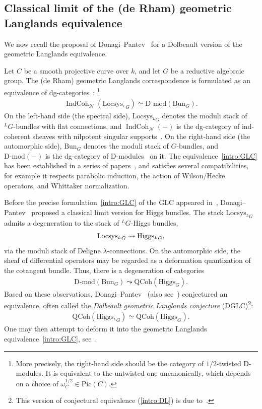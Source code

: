 \documentclass [11pt,oneside,a4paper,mathscr]{amsart}
\theoremstyle{definition}
\newcommand{\IndCoh}{\operatorname{IndCoh}}
\newcommand{\Hig}{\mathrm{Higgs}}
\newcommand{\Bun}{\mathrm{Bun}}
\begin{document}
\subsection{Classical limit of the (de Rham) geometric Langlands equivalence}

We now recall the proposal of Donagi--Pantev~\cite{DoPa} for a Dolbeault version of the geometric Langlands equivalence.

Let $C$ be a smooth projective curve over $k$, and let $G$ be a reductive algebraic group. The (de Rham) geometric Langlands correspondence is formulated as an equivalence of dg-categories~\cite{BD0, AG}: 
\footnote{
More precisely, the right-hand side should be the category of $1/2$-twisted D-modules.
It is equivalent to the untwisted one uncanonically, which depends on a choice of $\omega_C^{1/2}\in \mathrm{Pic}(C)$.}
\begin{align}\label{intro:GLC} \IndCoh_{\mathcal{N}}(\mathrm{Locsys}_{^{L}G}) \simeq \mathrm{D\text{-}mod}(\Bun_G). \end{align} 
On the left-hand side (the spectral side), $\mathrm{Locsys}_{^{L}G}$ denotes the moduli stack of $^{L}G$-bundles with flat connections, and $\IndCoh_{\mathcal{N}}(-)$ is the dg-category of ind-coherent sheaves with nilpotent singular supports~\cite{AG}.
On the right-hand side (the automorphic side), $\Bun_G$ denotes the moduli stack of $G$-bundles, and $\mathrm{D\text{-}mod}(-)$ is the dg-category of D-modules~\cite{GaiCry} on it.
The equivalence~\eqref{intro:GLC} has been established in a series of papers~\cite{GLC1, GLC2, GLC3, GLC4, GLC5}, and satisfies several compatibilities, for example it respects parabolic induction, the action of Wilson/Hecke operators, and Whittaker normalization.

Before the precise formulation~\eqref{intro:GLC} of the GLC appeared in~\cite{AG}, Donagi–Pantev~\cite{DoPa} proposed a classical limit version for Higgs bundles. The stack $\mathrm{Locsys}_{^{L}G}$ admits a degeneration to the stack of $^{L}G$-Higgs bundles, \begin{align}\notag \mathrm{Locsys}_{^{L}G} \leadsto \Hig_{^{L}G}, \end{align} via the moduli stack of Deligne $\lambda$-connections.
On the automorphic side, the sheaf of differential operators may be regarded as a deformation quantization of the cotangent bundle. Thus, there is a degeneration of categories \begin{align*} \mathrm{D\text{-}mod}(\Bun_G) \leadsto \mathrm{QCoh}(\Hig_G).
\end{align*} Based on these observations, Donagi–Pantev~\cite{DoPa} (also see~\cite[Conjecture~1.3]{ZN}) conjectured an equivalence, often called the \emph{Dolbeault geometric Langlands conjecture} (DGLC)\footnote{This version of conjectural equivalence (\ref{intro:DL}) is due to~\cite[Conjecture~1.3]{ZN}.}: \begin{align}\label{intro:DL} \mathrm{QCoh}(\Hig_{^{L}G}) \simeq \mathrm{QCoh}(\Hig_{G}). \end{align} 
One may then attempt to deform it into the geometric Langlands equivalence~\eqref{intro:GLC}, see~\cite{BezBra}.
\end{document}
